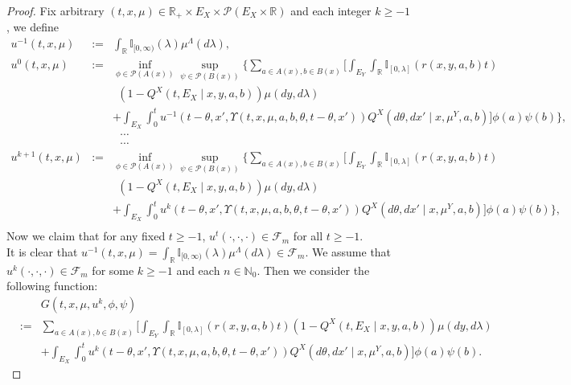 \documentclass[12pt]{article}
\begin{document}
\begin{proof}
Fix arbitrary $(t,x,\mu)\in \mathbb{R}_+\times E_X\times \mathscr{P}(E_X\times \mathbb{R})$ and each integer $k\ge -1$, we define
\begin{eqnarray}\label{thm2-2}
u^{-1}(t,x,\mu)&:=&\int_{\mathbb{R}}
\mathbb{I}_{[0,\infty)}(\lambda)\mu^{\Lambda}(d\lambda),\nonumber\\
u^{0}(t,x,\mu)&:=&\inf_{\phi\in\mathscr{P}(A(x))}\sup_{\psi\in\mathscr{P}(B(x))}
\bigg\{\sum_{a\in A(x),b\in B(x)}\bigg[\int_{E_Y}\int_{\mathbb{R}}
\mathbb{I}_{[0,\lambda]}(r(x,y,a,b)t)\nonumber\\
&&~~(1-Q^X(t,E_X\mid x,y,a,b))\mu(dy,d\lambda)\nonumber\\
&&+\int_{E_X}\int_0^t u^{-1}(t-\theta,x',\Upsilon(t,x,\mu,a,b,\theta,t-\theta,x'))
Q^X(d\theta,dx'\mid x,\mu^Y,a,b)\bigg]\phi(a)\psi(b)\bigg\},\nonumber\\
&&~~~\cdots\nonumber\\
&&~~~\cdots\nonumber\\
u^{k+1}(t,x,\mu)&:=&\inf_{\phi\in\mathscr{P}(A(x))}\sup_{\psi\in\mathscr{P}(B(x))}
\bigg\{\sum_{a\in A(x),b\in B(x)}\bigg[\int_{E_Y}\int_{\mathbb{R}}
\mathbb{I}_{[0,\lambda]}(r(x,y,a,b)t)\nonumber\\
&&~~(1-Q^X(t,E_X\mid x,y,a,b))\mu(dy,d\lambda)\nonumber\\
&&+\int_{E_X}\int_0^t u^{k}(t-\theta,x',\Upsilon(t,x,\mu,a,b,\theta,t-\theta,x'))
Q^X(d\theta,dx'\mid x,\mu^Y,a,b)\bigg]\phi(a)\psi(b)\bigg\},\nonumber\\
\end{eqnarray}
Now we claim that for any fixed $t\ge -1$, $u^t(\cdot,\cdot,\cdot)\in\mathscr{F}_m$ for all $t\ge -1$.
\\It is clear that $u^{-1}(t,x,\mu)=\int_{\mathbb{R}}
\mathbb{I}_{[0,\infty)}(\lambda)\mu^{\Lambda}(d\lambda)\in\mathscr{F}_m$.
We assume that $u^k(\cdot,\cdot,\cdot)\in\mathscr{F}_m$ for some $k\ge -1$ and each $n\in\mathbb{N}_0$.
Then we consider the following function:
\begin{eqnarray}\label{thm2-3}
&&G(t,x,\mu,u^k,\phi,\psi)\nonumber\\
&:=&\sum_{a\in A(x),b\in B(x)}\bigg[\int_{E_Y}\int_{\mathbb{R}}
\mathbb{I}_{[0,\lambda]}(r(x,y,a,b)t)(1-Q^X(t,E_X\mid x,y,a,b))\mu(dy,d\lambda)\nonumber\\
&&+\int_{E_X}\int_0^t u^{k}(t-\theta,x',\Upsilon(t,x,\mu,a,b,\theta,t-\theta,x'))
Q^X(d\theta,dx'\mid x,\mu^Y,a,b)\bigg]\phi(a)\psi(b).

\end{eqnarray}
\end{proof}
\end{document}
